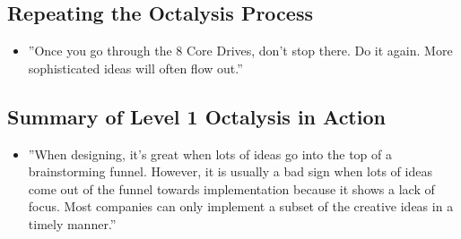 \subsection{Repeating the Octalysis Process}
\begin{itemize}
    \item ''Once you go through the 8 Core Drives, don't stop there. Do it again. More sophisticated ideas will often flow out.''
\end{itemize}

\subsection{Summary of Level 1 Octalysis in Action}
\begin{itemize}
    \item ''When designing, it's great when lots of ideas go into the top of a brainstorming funnel. However, it is usually a bad sign when lots of ideas come out of the funnel towards implementation because it shows a lack of focus. Most companies can only implement a subset of the creative ideas in a timely manner.''
\end{itemize}

